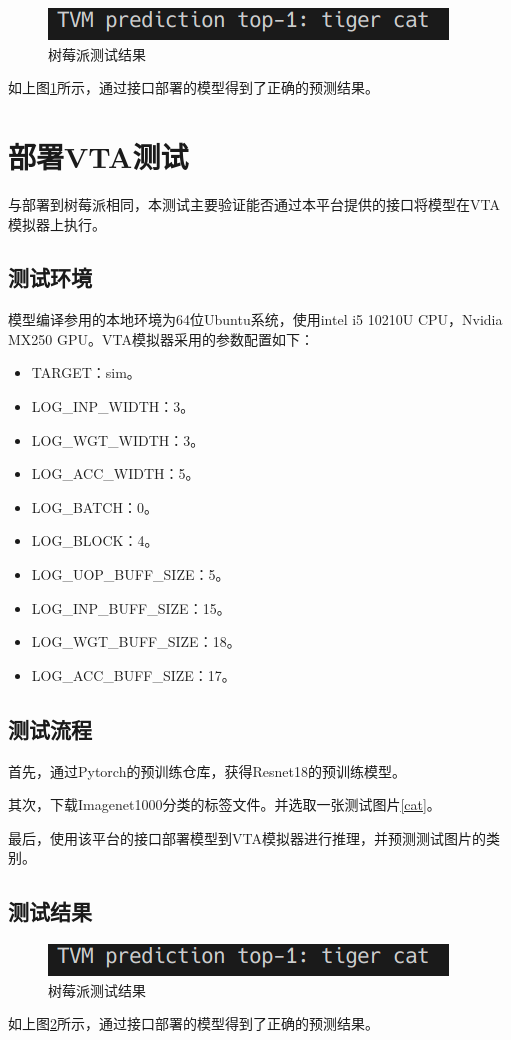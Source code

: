 \begin{figure}
    \centering
    \includegraphics[width=180bp]{figure/expr_rasp.png}
    \caption{树莓派测试结果}
    \label{expr_rasp}
\end{figure}

如上图\ref{expr_rasp}所示，通过接口部署的模型得到了正确的预测结果。


\section{部署VTA测试}

与部署到树莓派相同，本测试主要验证能否通过本平台提供的接口将模型在VTA模拟器上执行。

\subsection{测试环境}

模型编译参用的本地环境为64位Ubuntu系统，使用intel i5 10210U CPU，Nvidia MX250 GPU。VTA模拟器采用的参数配置如下：
\begin{itemize}
    \item {TARGET：sim。}
    \item {LOG\_INP\_WIDTH：3。}
    \item {LOG\_WGT\_WIDTH：3。}
    \item {LOG\_ACC\_WIDTH：5。}
    \item {LOG\_BATCH：0。}
    \item {LOG\_BLOCK：4。}
    \item {LOG\_UOP\_BUFF\_SIZE：5。}
    \item {LOG\_INP\_BUFF\_SIZE：15。}
    \item {LOG\_WGT\_BUFF\_SIZE：18。}
    \item {LOG\_ACC\_BUFF\_SIZE：17。}
\end{itemize}


\subsection{测试流程}

首先，通过Pytorch的预训练仓库，获得Resnet18的预训练模型。

其次，下载Imagenet1000分类的标签文件。并选取一张测试图片\ref{cat}。

最后，使用该平台的接口部署模型到VTA模拟器进行推理，并预测测试图片的类别。


\subsection{测试结果}

\begin{figure}
    \centering
    \includegraphics[width=180bp]{figure/expr_rasp.png}
    \caption{树莓派测试结果}
    \label{expr_vta}
\end{figure}

如上图\ref{expr_vta}所示，通过接口部署的模型得到了正确的预测结果。